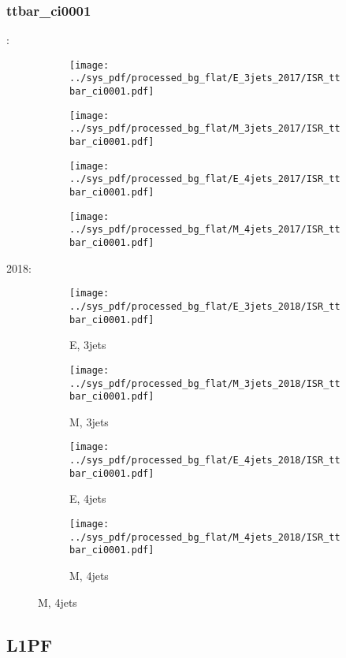 \documentclass{beamer}
\begin{document}
\begin{frame}
\frametitle{ttbar_ci0001}
\fontsize{5}{1}:
\begin{figure}
\centering
\begin{subfigure}[b]{0.24\textwidth}
\texttt{[image: ../sys\_pdf/processed\_bg\_flat/E\_3jets\_2017/ISR\_ttbar\_ci0001.pdf]}
\end{subfigure}
\begin{subfigure}[b]{0.24\textwidth}
\texttt{[image: ../sys\_pdf/processed\_bg\_flat/M\_3jets\_2017/ISR\_ttbar\_ci0001.pdf]}
\end{subfigure}
\begin{subfigure}[b]{0.24\textwidth}
\texttt{[image: ../sys\_pdf/processed\_bg\_flat/E\_4jets\_2017/ISR\_ttbar\_ci0001.pdf]}
\end{subfigure}
\begin{subfigure}[b]{0.24\textwidth}
\texttt{[image: ../sys\_pdf/processed\_bg\_flat/M\_4jets\_2017/ISR\_ttbar\_ci0001.pdf]}
\end{subfigure}
\end{figure}
2018:
\begin{figure}
\centering
\begin{subfigure}[b]{0.24\textwidth}
\texttt{[image: ../sys\_pdf/processed\_bg\_flat/E\_3jets\_2018/ISR\_ttbar\_ci0001.pdf]}
\captionsetup{font=tiny}
\caption{E, 3jets}
\end{subfigure}
\begin{subfigure}[b]{0.24\textwidth}
\texttt{[image: ../sys\_pdf/processed\_bg\_flat/M\_3jets\_2018/ISR\_ttbar\_ci0001.pdf]}
\captionsetup{font=tiny}
\caption{M, 3jets}
\end{subfigure}
\begin{subfigure}[b]{0.24\textwidth}
\texttt{[image: ../sys\_pdf/processed\_bg\_flat/E\_4jets\_2018/ISR\_ttbar\_ci0001.pdf]}
\captionsetup{font=tiny}
\caption{E, 4jets}
\end{subfigure}
\begin{subfigure}[b]{0.24\textwidth}
\texttt{[image: ../sys\_pdf/processed\_bg\_flat/M\_4jets\_2018/ISR\_ttbar\_ci0001.pdf]}
\captionsetup{font=tiny}
\caption{M, 4jets}
\end{subfigure}
\end{figure}
\end{frame}


\subsection{L1PF}
\end{document}
